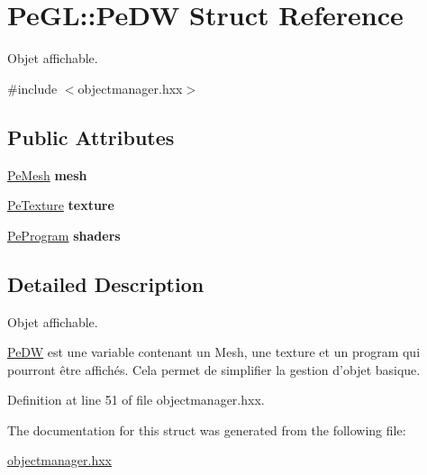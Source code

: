 \hypertarget{structPeGL_1_1PeDW}{\section{Pe\-G\-L\-:\-:Pe\-D\-W Struct Reference}
\label{structPeGL_1_1PeDW}
}


Objet affichable.  




{\ttfamily \#include $<$objectmanager.\-hxx$>$}

\subsection*{Public Attributes}
\begin{DoxyCompactItemize}
\item 
\hypertarget{structPeGL_1_1PeDW_ad3a6e5891a277fe75475a403f8470007}{\hyperlink{structPeGL_1_1PeMesh}{Pe\-Mesh} {\bfseries mesh}}\label{structPeGL_1_1PeDW_ad3a6e5891a277fe75475a403f8470007}

\item 
\hypertarget{structPeGL_1_1PeDW_a05b5ddd3f1d36b4db9c2ebd47316866d}{\hyperlink{structPeGL_1_1PeTexture}{Pe\-Texture} {\bfseries texture}}\label{structPeGL_1_1PeDW_a05b5ddd3f1d36b4db9c2ebd47316866d}

\item 
\hypertarget{structPeGL_1_1PeDW_afd3f54eb955c32dcc4e64c1a724c9f08}{\hyperlink{structPeGL_1_1PeProgram}{Pe\-Program} {\bfseries shaders}}\label{structPeGL_1_1PeDW_afd3f54eb955c32dcc4e64c1a724c9f08}

\end{DoxyCompactItemize}


\subsection{Detailed Description}
Objet affichable. 

\hyperlink{structPeGL_1_1PeDW}{Pe\-D\-W} est une variable contenant un Mesh, une texture et un program qui pourront être affichés. Cela permet de simplifier la gestion d'objet basique. 

Definition at line 51 of file objectmanager.\-hxx.



The documentation for this struct was generated from the following file\-:\begin{DoxyCompactItemize}
\item 
\hyperlink{objectmanager_8hxx}{objectmanager.\-hxx}\end{DoxyCompactItemize}
